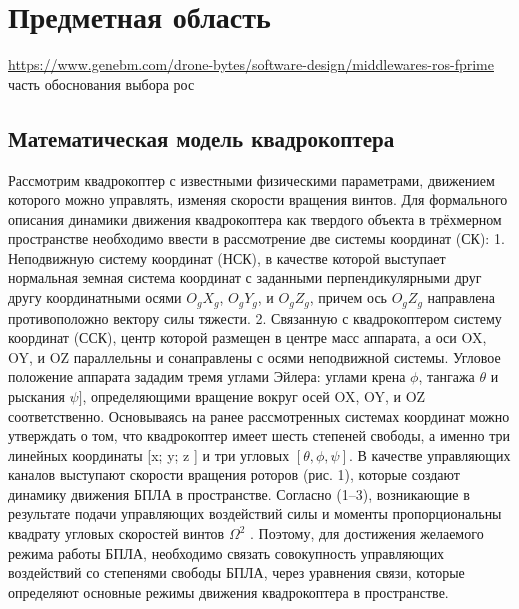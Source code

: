 
\section{Предметная область}

\url{https://www.genebm.com/drone-bytes/software-design/middlewares-ros-fprime} часть обоснования выбора рос

\subsection{Математическая модель квадрокоптера}
Рассмотрим квадрокоптер с известными физическими параметрами, движением которого можно управлять, изменяя скорости вращения винтов. Для формального описания динамики движения квадрокоптера как твердого объекта в трёхмерном пространстве необходимо ввести в рассмотрение две системы координат (СК):
1. Неподвижную систему координат (НСК), в качестве которой выступает нормальная земная система координат с заданными перпендикулярными друг другу координатными осями \(O_{g}X_{g}\), \(O_{g}Y_{g}\), и \(O_{g}Z_{g}\), причем ось \(O_{g}Z_{g}\) направлена противоположно вектору силы тяжести.
2. Связанную с квадрокоптером систему координат (ССК), центр которой размещен в центре масс аппарата, а оси OX, OY, и OZ параллельны и сонаправлены с осями неподвижной системы. Угловое положение аппарата зададим тремя углами Эйлера: углами крена \(\phi\), тангажа \(\theta\) и рыскания \(\psi]\), определяющими вращение вокруг осей OX, OY, и OZ соответственно. Основываясь на ранее рассмотренных системах координат можно утверждать о том, что квадрокоптер имеет шесть степеней свободы, а именно три линейных координаты [x; y; z ] и три угловых \([\theta, \phi, \psi]\). В качестве управляющих каналов выступают скорости вращения роторов (рис. 1), которые создают динамику движения БПЛА в пространстве. Согласно (1–3), возникающие в результате подачи управляющих воздействий силы и моменты пропорциональны квадрату угловых скоростей винтов \(\Omega^2\) . Поэтому, для достижения желаемого режима работы БПЛА, необходимо связать совокупность управляющих воздействий со степенями свободы БПЛА, через уравнения связи, которые определяют основные режимы движения квадрокоптера в пространстве.

